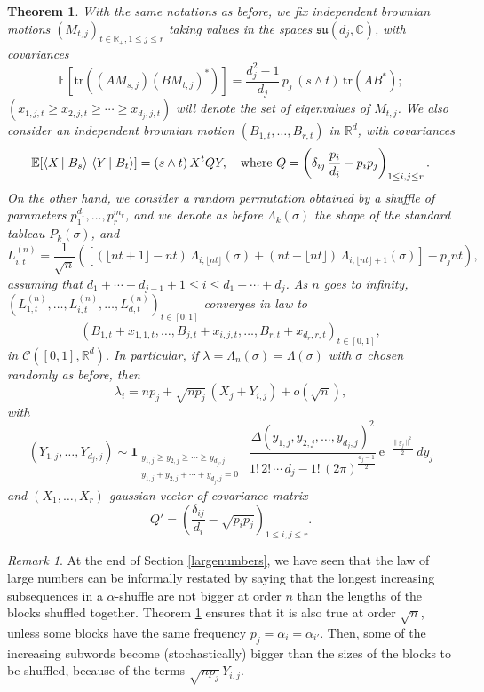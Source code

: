 \documentclass[smallextended,nospthms]{svjour3}
\newtheorem{theorem}{Theorem}
\theoremstyle{remark}
\newtheorem*{remark}{Remark}
\newcommand{\E}{\mathrm{e}}
\newcommand{\R}{\mathbb{R}}
\newcommand{\C}{\mathbb{C}}
\newcommand{\esper}{\mathbb{E}}
\newcommand{\scal}[2]{\left\langle #1\vphantom{#2}\,\right |\left.#2 \vphantom{#1}\right\rangle}
\begin{document}
\begin{theorem}\label{maingeom}
With the same notations as before, we fix independent brownian motions $(M_{t,j})_{t \in \R_{+}, 1\leq j \leq r}$ taking values in the spaces $\mathfrak{su}(d_{j},\C)$, with covariances 
$$\esper[\mathrm{tr}((AM_{s,j})(BM_{t,j})^{*})]=\frac{d_{j}^{2}-1}{d_{j}}\,p_{j}\,(s\wedge t)\,\mathrm{tr}(AB^{*});$$
$(x_{1,j,t}\geq x_{2,j,t}\geq \cdots \geq x_{d_{j},j,t})$ will denote the set of eigenvalues of $M_{t,j}$. We also consider an independent brownian motion $(B_{1,t},\ldots,B_{r,t})$ in $\R^{d}$, with covariances 
$$\esper[\scal{X}{B_{s}}\,\scal{Y}{B_{t}}]=(s \wedge t)\,X^{t}QY,\quad \text{where }Q=\left(\delta_{ij}\,\frac{p_{i}}{d_{i}}-p_{i}p_{j}\right)_{1\leq i,j\leq r}. $$
On the other hand, we consider a random permutation obtained by a shuffle of parameters $p_{1}^{d_{1}},\ldots,p_{r}^{m_{r}}$, and we denote as before $\Lambda_{k}(\sigma)$ the shape of the standard tableau $P_{k}(\sigma)$, and 
$$L_{i,t}^{(n)}= \frac{1}{\sqrt{n}}\left(\left[(\lfloor nt +1\rfloor-nt)\,\Lambda_{i,\lfloor nt \rfloor}(\sigma)+ (nt-\lfloor nt\rfloor)\,\Lambda_{i,\lfloor nt \rfloor +1}(\sigma)\right]-p_{j}nt\right),$$
assuming that $d_{1}+\cdots+d_{j-1}+1\leq i\leq d_{1}+\cdots+d_{j}$. As $n$ goes to infinity, $\left(L_{1,t}^{(n)},\ldots,L_{i,t}^{(n)},\ldots,L_{d,t}^{(n)}\right)_{t \in [0,1]}$ converges in law to
$$\left(B_{1,t}+x_{1,1,t},\ldots,B_{j,t}+x_{i,j,t},\ldots,B_{r,t}+x_{d_{r},r,t}\right)_{t \in [0,1]},$$
in $\mathscr{C}([0,1],\R^{d})$. In particular, if $\lambda=\Lambda_{n}(\sigma)=\Lambda(\sigma)$ with $\sigma$ chosen randomly as before, then $$\lambda_{i}=np_{j}+\sqrt{np_{j}}\,(X_{j}+Y_{i,j})+o\left(\sqrt{n}\right),$$ with
$$(Y_{1,j},\ldots,Y_{d_{j},j})\sim \mathbf{1}_{\substack{y_{1,j}\geq y_{2,j}\geq  \cdots \geq y_{d_{j},j}\quad \\ y_{1,j}+y_{2,j}+\cdots+y_{d_{j},j}=0}}\,\,\,\frac{\Delta(y_{1,j},y_{2,j},\ldots,y_{d_{j},j})^{2}}{1!\,2!\,\cdots\,d_{j}-1!\,(2\pi)^{\frac{d_{j}-1}{2}}}\,\E^{-\frac{\|y_{j}\|^{2}}{2}}\,dy_{j}$$
and $(X_{1},\ldots,X_{r})$ gaussian vector of covariance matrix  $$Q'=\left(\frac{\delta_{ij}}{d_{i}}-\sqrt{p_{i}p_{j}}\right)_{1\leq i,j \leq r}.$$
\end{theorem}
\begin{remark}
At the end of Section \ref{largenumbers}, we have seen that the law of large numbers can be informally restated by saying that the longest increasing subsequences in a $\alpha$-shuffle are not bigger at order $n$ than the lengths of the blocks shuffled together. Theorem \ref{maingeom} ensures that it is also true at order $\sqrt{n}$, unless some blocks have the same frequency $p_{j}= \alpha_{i}=\alpha_{i'}$. Then, some of the increasing subwords become (stochastically) bigger than the sizes of the blocks to be shuffled, because of the terms $\sqrt{np_{j}} \,Y_{i,j}$.
\end{remark}
\bigskip
\bigskip
\end{document}
